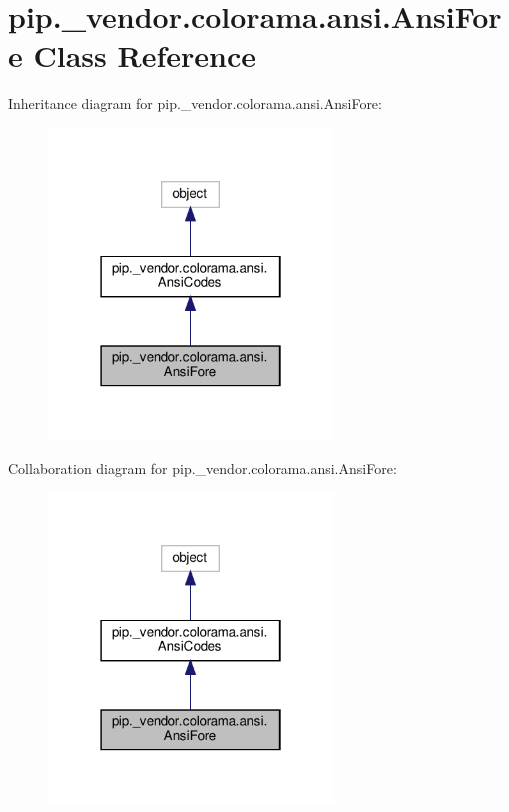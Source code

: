 \hypertarget{classpip_1_1__vendor_1_1colorama_1_1ansi_1_1AnsiFore}{}\section{pip.\+\_\+vendor.\+colorama.\+ansi.\+Ansi\+Fore Class Reference}
\label{classpip_1_1__vendor_1_1colorama_1_1ansi_1_1AnsiFore}


Inheritance diagram for pip.\+\_\+vendor.\+colorama.\+ansi.\+Ansi\+Fore\+:
\nopagebreak
\begin{figure}[H]
\begin{center}
\leavevmode
\includegraphics[width=214pt]{classpip_1_1__vendor_1_1colorama_1_1ansi_1_1AnsiFore__inherit__graph}
\end{center}
\end{figure}


Collaboration diagram for pip.\+\_\+vendor.\+colorama.\+ansi.\+Ansi\+Fore\+:
\nopagebreak
\begin{figure}[H]
\begin{center}
\leavevmode
\includegraphics[width=214pt]{classpip_1_1__vendor_1_1colorama_1_1ansi_1_1AnsiFore__coll__graph}
\end{center}
\end{figure}
